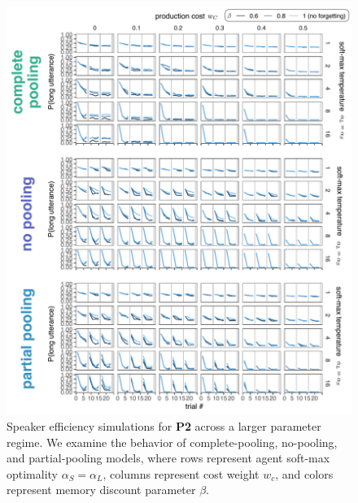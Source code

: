 \documentclass[10pt, jou, floatsintext]{apa7}
\begin{document}
 \begin{figure}
\centering
    \includegraphics[scale=.8]{grid_all_models.pdf}
  \caption{Speaker efficiency simulations for \textbf{P2} across a larger parameter regime. We examine the behavior of complete-pooling, no-pooling, and partial-pooling models, where rows represent agent soft-max optimality $\alpha_S = \alpha_L$, columns represent cost weight $w_c$, and colors represent memory discount parameter $\beta$.}
  \label{fig:partnerspecificity_grid}
\end{figure}
\end{document}
